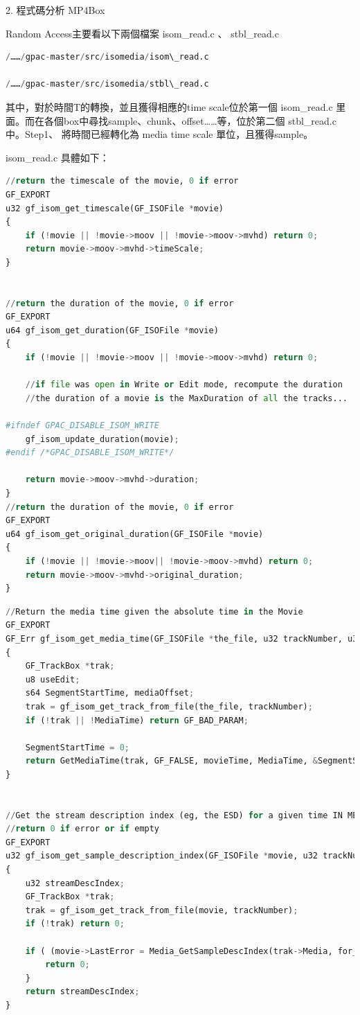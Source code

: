 \documentclass[10pt,UTF8]{ctexart}
\begin{document}
2. 程式碼分析 MP4Box

Random Access主要看以下兩個檔案 isom\_read.c 、 stbl\_read.c

\begin{lstlisting}[language={python}]
/……/gpac-master/src/isomedia/isom\_read.c

/……/gpac-master/src/isomedia/stbl\_read.c
\end{lstlisting}

其中，對於時間T的轉換，並且獲得相應的time scale位於第⼀個 isom\_read.c ⾥⾯。⽽在各個box中尋找sample、chunk、offset……等，位於第⼆個 stbl\_read.c 中。Step1、 將時間已經轉化為 media time scale 單位，且獲得sample。

isom\_read.c 具體如下：

\begin{lstlisting}[language={python}]
//return the timescale of the movie, 0 if error
GF_EXPORT
u32 gf_isom_get_timescale(GF_ISOFile *movie)
{
	if (!movie || !movie->moov || !movie->moov->mvhd) return 0;
	return movie->moov->mvhd->timeScale;
}


//return the duration of the movie, 0 if error
GF_EXPORT
u64 gf_isom_get_duration(GF_ISOFile *movie)
{
	if (!movie || !movie->moov || !movie->moov->mvhd) return 0;

	//if file was open in Write or Edit mode, recompute the duration
	//the duration of a movie is the MaxDuration of all the tracks...

#ifndef GPAC_DISABLE_ISOM_WRITE
	gf_isom_update_duration(movie);
#endif /*GPAC_DISABLE_ISOM_WRITE*/

	return movie->moov->mvhd->duration;
}
//return the duration of the movie, 0 if error
GF_EXPORT
u64 gf_isom_get_original_duration(GF_ISOFile *movie)
{
	if (!movie || !movie->moov|| !movie->moov->mvhd) return 0;
	return movie->moov->mvhd->original_duration;
}
\end{lstlisting}


\begin{lstlisting}[language={python}]
//Return the media time given the absolute time in the Movie
GF_EXPORT
GF_Err gf_isom_get_media_time(GF_ISOFile *the_file, u32 trackNumber, u32 movieTime, u64 *MediaTime)
{
	GF_TrackBox *trak;
	u8 useEdit;
	s64 SegmentStartTime, mediaOffset;
	trak = gf_isom_get_track_from_file(the_file, trackNumber);
	if (!trak || !MediaTime) return GF_BAD_PARAM;

	SegmentStartTime = 0;
	return GetMediaTime(trak, GF_FALSE, movieTime, MediaTime, &SegmentStartTime, &mediaOffset, &useEdit, NULL);
}


//Get the stream description index (eg, the ESD) for a given time IN MEDIA TIMESCALE
//return 0 if error or if empty
GF_EXPORT
u32 gf_isom_get_sample_description_index(GF_ISOFile *movie, u32 trackNumber, u64 for_time)
{
	u32 streamDescIndex;
	GF_TrackBox *trak;
	trak = gf_isom_get_track_from_file(movie, trackNumber);
	if (!trak) return 0;

	if ( (movie->LastError = Media_GetSampleDescIndex(trak->Media, for_time, &streamDescIndex)) ) {
		return 0;
	}
	return streamDescIndex;
}

\end{lstlisting}
\end{document}
